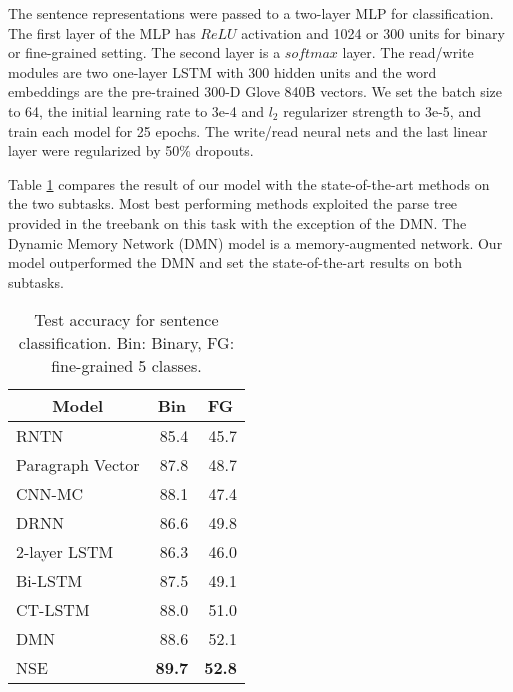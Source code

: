 \documentclass{article}
\begin{document}
The sentence representations were passed to a two-layer MLP for classification. The first layer of the MLP has $ReLU$ activation and 1024 or 300 units for binary or fine-grained setting. The second layer is a $softmax$ layer. The read/write modules are two one-layer LSTM with 300 hidden units and the word embeddings are the pre-trained 300-D Glove 840B vectors. We set the batch size to 64, the initial learning rate to 3e-4 and $l_2$ regularizer strength to 3e-5, and train each model for 25 epochs. The write/read neural nets and the last linear layer were regularized by 50\% dropouts. 

Table \ref{table:sent} compares the result of our model with the state-of-the-art methods on the two subtasks. Most best performing methods exploited the parse tree provided in the treebank on this task with the exception of the DMN. The Dynamic Memory Network (DMN) model is a memory-augmented network. Our model outperformed the DMN and set the state-of-the-art results on both subtasks.

\begin{table}[t]
\begin{center}
\small
\begin{tabular}{c|c|c}
\hline 
Model & Bin & FG \\
\hline
\multicolumn{1}{l|}{RNTN \cite{socher2013recursive}} & \multicolumn{1}{|r|}{85.4} & \multicolumn{1}{|r}{45.7} \\
\multicolumn{1}{l|}{Paragraph Vector \cite{le2014}} & \multicolumn{1}{|r|}{87.8} & \multicolumn{1}{|r}{48.7} \\
\multicolumn{1}{l|}{CNN-MC \cite{kim:13}} & \multicolumn{1}{|r|}{88.1} & \multicolumn{1}{|r}{47.4} \\
\multicolumn{1}{l|}{DRNN \cite{irsoy15}} & \multicolumn{1}{|r|}{86.6} & \multicolumn{1}{|r}{49.8} \\
\multicolumn{1}{l|}{2-layer LSTM\cite{tai2015improved}} & \multicolumn{1}{|r|}{86.3} & \multicolumn{1}{|r}{46.0} \\
\multicolumn{1}{l|}{Bi-LSTM\cite{tai2015improved}} & \multicolumn{1}{|r|}{87.5} & \multicolumn{1}{|r}{49.1} \\
\multicolumn{1}{l|}{CT-LSTM\cite{tai2015improved}} & \multicolumn{1}{|r|}{88.0} & \multicolumn{1}{|r}{51.0} \\
\multicolumn{1}{l|}{DMN \cite{ankit16}} & \multicolumn{1}{|r|}{88.6} & \multicolumn{1}{|r}{52.1} \\
\multicolumn{1}{l|}{NSE} & \multicolumn{1}{|r|}{\bf 89.7} & \multicolumn{1}{|r}{\bf 52.8} \\
\hline
\end{tabular}
\end{center}
\caption{\label{table:sent}Test accuracy for sentence classification. Bin: Binary, FG: fine-grained 5 classes.}
\end{table}
\end{document}
